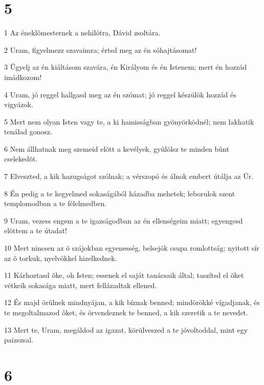 \chapter{5}

\par 1 Az éneklõmesternek a nehilótra, Dávid zsoltára.
\par 2 Uram, figyelmezz szavaimra; értsd meg az én sóhajtásomat!
\par 3 Ügyelj az én kiáltásom szavára, én Királyom és én Istenem; mert én hozzád imádkozom!
\par 4 Uram, jó reggel hallgasd meg az én szómat; jó reggel készülök hozzád és vigyázok.
\par 5 Mert nem olyan Isten vagy te, a ki hamisságban gyönyörködnél; nem lakhatik tenálad gonosz.
\par 6 Nem állhatnak meg szemeid elõtt a kevélyek, gyûlölsz te minden bûnt cselekedõt.
\par 7 Elveszted, a kik hazugságot szólnak; a vérszopó és álnok embert útálja az Úr.
\par 8 Én pedig a te kegyelmed sokaságából házadba mehetek; leborulok szent templomodban a te félelmedben.
\par 9 Uram, vezess engem a te igazságodban az én ellenségeim miatt; egyengesd elõttem a te útadat!
\par 10 Mert nincsen az õ szájokban egyenesség, belsejök csupa romlottság; nyitott sír az õ torkuk, nyelvökkel hizelkednek.
\par 11 Kárhoztasd õke, oh Isten; essenek el saját tanácsaik által; taszítsd el õket vétkeik sokasága miatt, mert fellázadtak ellened.
\par 12 És majd örülnek mindnyájan, a kik bíznak benned; mindörökké vígadjanak, és te megoltalmazod õket, és örvendeznek te benned, a kik szeretik a te nevedet.
\par 13 Mert te, Uram, megáldod az igazat, körülveszed a te jóvoltoddal, mint egy paizszsal.

\chapter{6}

